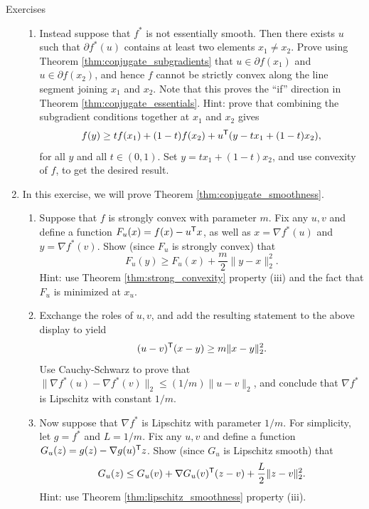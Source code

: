 \begin{xcb}{Exercises}
\begin{enumerate}[label=\thechapter.\arabic*]
\begin{enumerate}[label=\alph*.]

\item Instead suppose that $f^*$ is not essentially smooth. Then there exists
  $u$ such that $\partial f^*(u)$ contains at least two elements $x_1 \not= 
  x_2$. Prove using Theorem \ref{thm:conjugate_subgradients} that $u \in
  \partial f(x_1)$ and $u \in \partial f(x_2)$, and hence $f$ cannot be strictly
  convex along the line segment joining $x_1$ and $x_2$. Note that this proves
  the ``if'' direction in Theorem \ref{thm:conjugate_essentials}. Hint: prove
  that combining the subgradient conditions together at $x_1$ and $x_2$ gives  
  \[
  f(y) \geq tf(x_1) + (1-t)f(x_2) + u^{\mathsf{T}} (y - tx_1 + (1-t)x_2),
  \]
  for all $y$ and all $t \in (0,1)$. Set $y = tx_1 + (1-t)x_2$, and use
  convexity of $f$, to get the desired result. 
\end{enumerate}

\item \label{ex:conjugate_smoothness}
  In this exercise, we will prove Theorem \ref{thm:conjugate_smoothness}.

\begin{enumerate}[label=\alph*.]
\item Suppose that $f$ is strongly convex with parameter $m$. Fix any $u,v$ and
  define a function $F_u(x) = f(x) - u^{\mathsf{T}} x$, as well as $x = \nabla f^*(u)$ and
  $y = \nabla f^*(v)$. Show (since $F_u$ is strongly convex) that 
  \[
  F_u(y) \geq F_u(x) + \frac{m}{2} \|y-x\|_2^2.
  \]
  Hint:  use Theorem \ref{thm:strong_convexity} property (iii) and the fact that
  $F_u$ is minimized at $x_u$. 

\item Exchange the roles of $u,v$, and add the resulting statement to the above
  display to yield 
  \[
  (u-v)^{\mathsf{T}} (x-y) \geq m \|x-y\|_2^2.
  \]
  Use Cauchy-Schwarz to prove that $\|\nabla f^*(u) - \nabla f^*(v)\|_2 \leq
  (1/m) \|u-v\|_2$, and conclude that $\nabla f^*$ is Lipschitz with constant
  $1/m$.    

\item Now suppose that $\nabla f^*$ is Lipschitz with parameter $1/m$. For
  simplicity, let $g=f^*$ and $L=1/m$. Fix any $u,v$ and define a function
  $G_u(z) = g(z) - \nabla g(u)^{\mathsf{T}} z$. Show (since $G_u$ is Lipschitz smooth) 
  that  
  \[
  G_u(z) \leq G_u(v) + \nabla G_u(v)^{\mathsf{T}} (z-v) + \frac{L}{2}\|z-v\|_2^2. 
  \]
  Hint: use Theorem \ref{thm:lipschitz_smoothness} property (iii).


\end{enumerate}
\end{enumerate}
\end{xcb}

